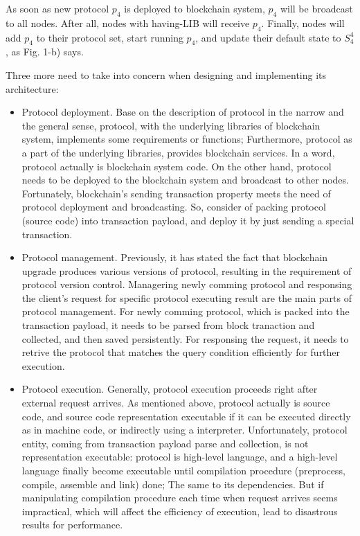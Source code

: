\documentclass[sigplan,screen]{acmart}
\begin{document}
As soon as new protocol $p_4$ is deployed to blockchain system,
$p_4$ will be broadcast to all nodes. After all, nodes with having-LIB
will receive $p_4$. Finally, nodes will add $p_4$ to their protocol set, start
running $p_4$, and update their default state to $S_4^4$, as Fig. 1-b) says.


Three more need to take into concern when designing and implementing its
architecture:
\begin{itemize}
  \item Protocol deployment. Base on the description of protocol in the narrow
    and the general sense, protocol, with the underlying libraries of
    blockchain system, implements some requirements or functions; Furthermore,
    protocol as a part of the underlying libraries, provides blockchain services.
    In a word, protocol actually is blockchain system code. On the other hand,
    protocol needs to be deployed to the blockchain system and broadcast to
    other nodes. Fortunately, blockchain's sending transaction property meets
    the need of protocol deployment and broadcasting. So, consider of packing
    protocol (source code) into transaction payload, and deploy it by just
    sending a special transaction.
  \item Protocol management. Previously, it has stated the fact that blockchain
    upgrade produces various versions of protocol, resulting in the
    requirement of protocol version control. Managering newly comming protocol
    and responsing the client's request for specific protocol executing result
    are the main parts of protocol management. For newly comming protocol,
    which is packed into the transaction payload, it needs to be parsed from
    block tranaction and collected, and then saved persistently. For responsing
    the request, it needs to retrive the protocol that matches the query
    condition efficiently for further execution.
  \item Protocol execution. Generally, protocol execution proceeds right after external
    request arrives. As mentioned above, protocol actually is source code, and
    source code representation executable if it can be executed directly as in
    machine code, or indirectly using a interpreter. Unfortunately, protocol
    entity, coming from transaction payload parse and collection, is not
    representation executable: protocol is high-level language, and a
    high-level language finally become executable until compilation procedure
    (preprocess, compile, assemble and link) done; The same to its
    dependencies. But if manipulating compilation procedure each time when
    request arrives seems impractical, which will affect the efficiency of
    execution, lead to disastrous results for performance.


\end{itemize}
\end{document}
